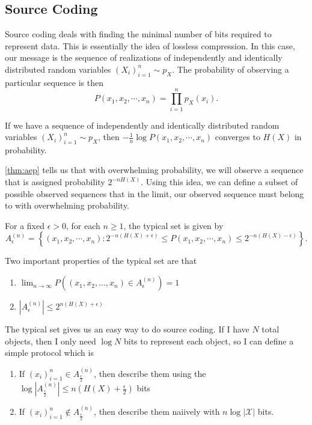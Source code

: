 \subsection{Source Coding}
Source coding deals with finding the minimal number of bits required to represent data.
This is essentially the idea of lossless compression.
In this case, our message is the sequence of realizations of independently and identically distributed random variables $\left(X_i\right)_{i=1}^n \sim p_X$.
The probability of observing a particular sequence is then \[
	P(x_1, x_2, \cdots, x_n) = \prod_{i=1}^np_X(x_i).
\]
\begin{theorem}
	If we have a sequence of independently and identically distributed random variables $\left(X_i\right)_{i=1}^n \sim p_X$, then $-\frac{1}{n}\log P(x_1, x_2, \cdots, x_n)$ converges to $H(X)$ in probability.
	\label{thm:aep}
\end{theorem}
\cref{thm:aep} tells us that with overwhelming probability, we will observe a sequence that is assigned probability $2^{-nH(X)}$.
Using this idea, we can define a subset of possible observed sequences that in the limit, our observed sequence must belong to with overwhelming probability.
\begin{definition}
	For a fixed $\epsilon > 0$, for each $n\geq 1$, the typical set is given by \[
		A_\epsilon^{(n)} = \left\{ (x_1, x_2, \cdots, x_n) : 2^{-n(H(X)+\epsilon)}\leq P(x_1, x_2, \cdots, x_n) \leq 2^{-n(H(X)-\epsilon)} \right\}.
	\]
	\label{defn:typical-set}
\end{definition}
Two important properties of the typical set are that
\begin{enumerate}
	\item $\lim_{n\to\infty}P\left((x_1, x_2, \ldots, x_n) \in A_{\epsilon}^{(n)}\right) = 1$
	\item $|A_{\epsilon}^{(n)}| \leq 2^{n(H(X)+\epsilon)}$
\end{enumerate}
The typical set gives us an easy way to do source coding.
If I have $N$ total objects, then I only need $\log N$ bits to represent each object, so I can define a simple protocol which is
\begin{enumerate}
	\item If $(x_i)_{i=1}^{n} \in A^{(n)}_{\frac{\epsilon}{2}}$, then describe them using the $\log|A^{(n)}_{\frac{\epsilon}{2}}| \leq n\left(H(X)+\frac{\epsilon}{2}\right)$ bits
	\item If $(x_i)_{i=1}^n \not \in A^{(n)}_{\frac{\epsilon}{2}}$, then describe them naiively with $n\log|\mathcal{X}|$ bits.
\end{enumerate}
